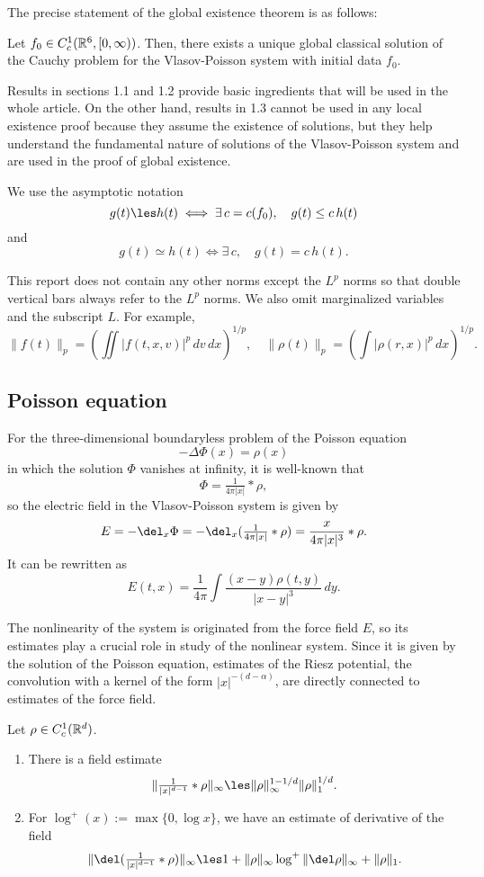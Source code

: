 \documentclass[11pt]{amsart}
\begin{document}
The precise statement of the global existence theorem is as follows:
\begin{thm}
Let $f_0\in C_c^1(\mathbb{R}^6,[0,\infty))$.
Then, there exists a unique global classical solution of the Cauchy problem for the Vlasov-Poisson system with initial data $f_0$.
\end{thm}

Results in sections 1.1 and 1.2 provide basic ingredients that will be used in the whole article.
On the other hand, results in 1.3 cannot be used in any local existence proof because they assume the existence of solutions, but they help understand the fundamental nature of solutions of the Vlasov-Poisson system and are used in the proof of global existence.

\begin{notn*}
We use the asymptotic notation
\[g(t)\les h(t)\iff\exists\,c=c(f_0),\quad g(t)\le c\,h(t)\]
and
\[g(t)\simeq h(t)\iff\exists\,c,\quad g(t)=c\,h(t).\]

This report does not contain any other norms except the $L^p$ norms so that double vertical bars always refer to the $L^p$ norms.
We also omit marginalized variables and the subscript $L$.
For example,
\[\|f(t)\|_p=(\iint|f(t,x,v)|^p\,dv\,dx)^{1/p},\quad\|\rho(t)\|_p=(\int|\rho(r,x)|^p\,dx)^{1/p}.\]
\end{notn*}



\subsection{Poisson equation}
For the three-dimensional boundaryless problem of the Poisson equation
\[-\Delta\Phi(x)=\rho(x)\]
in which the solution $\Phi$ vanishes at infinity, it is well-known that
\[\Phi=\tfrac1{4\pi|x|}*\rho,\]
so the electric field in the Vlasov-Poisson system is given by
\[E=-\del_x\Phi=-\del_x(\tfrac1{4\pi|x|}*\rho)=\frac{x}{4\pi|x|^3}*\rho.\]
It can be rewritten as
\[E(t,x)=\frac1{4\pi}\int\frac{(x-y)\rho(t,y)}{|x-y|^3}\,dy.\]

The nonlinearity of the system is originated from the force field $E$, so its estimates play a crucial role in study of the nonlinear system.
Since it is given by the solution of the Poisson equation, estimates of the Riesz potential, the convolution with a kernel of the form $|x|^{-(d-\alpha)}$, are directly connected to estimates of the force field.

\begin{lem}
Let $\rho\in C_c^1(\mathbb{R}^d)$.
\begin{enumerate}
\item
There is a field estimate
\[\|\tfrac1{|x|^{d-1}}*\rho\|_\infty\les\|\rho\|_\infty^{1-1/d}\|\rho\|_1^{1/d}.\]
\item
For $\log^+(x):=\max\{0,\log x\}$, we have an estimate of derivative of the field
\[\|\del(\tfrac1{|x|^{d-1}}*\rho)\|_\infty\les1+\|\rho\|_\infty\log^+\|\del\rho\|_\infty+\|\rho\|_1.\]
\end{enumerate}
\end{lem}
\end{document}

